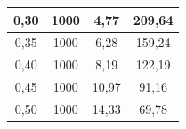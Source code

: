 \documentclass{article}
\begin{document}
\begin{table}[]
\begin{tabular}{|c|c|c|c|}
0,30                                                    & 1000                                                       & 4,77                                                  & 209,64                                                  \\ \hline
0,35                                                    & 1000                                                       & 6,28                                                  & 159,24                                                  \\ \hline
0,40                                                    & 1000                                                       & 8,19                                                  & 122,19                                                  \\ \hline
0,45                                                    & 1000                                                       & 10,97                                                 & 91,16                                                   \\ \hline
0,50                                                    & 1000                                                       & 14,33                                                 & 69,78                                                   \\ \hline
\end{tabular}
\end{table}
\end{document}
